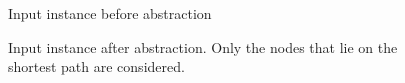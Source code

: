 \documentclass[runningheads]{llncs}
\begin{document}
\begin{figure}[h]
\begin{minipage}{.4\linewidth} 
\caption{Input instance before abstraction}
\label{fig:inst-bef-a}
\end{minipage}
\hspace{.1\linewidth}
\begin{minipage}{.4\linewidth} 
\caption{Input instance after abstraction. Only the nodes that lie on the shortest path are considered.}
\label{fig:inst-aft-a}
\end{minipage}
\end{figure} 
\end{document}
